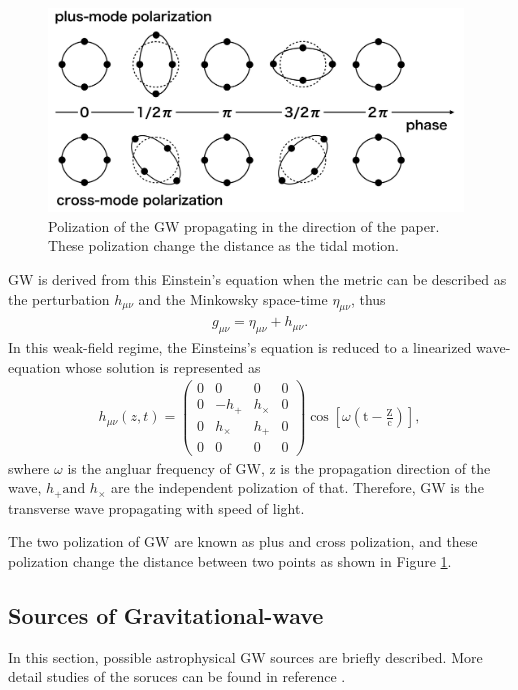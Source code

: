 \begin{figure}[t]
  \begin{center}   
    \includegraphics[width=11.0cm]{./img_chap1/img131.png}
    \caption[Polization of the GW]{Polization of the GW propagating in the direction of the paper. These polization change the distance as the tidal motion.
}\label{img:img131}
  \end{center}
\end{figure}

GW is derived from this Einstein's equation when the metric can be described as the perturbation $h_{\mu\nu}$ and the Minkowsky space-time $\eta_{\mu\nu}$, thus
\begin{eqnarray}
  g_{\mu \nu}=\eta_{\mu \nu}+h_{\mu \nu}.
\end{eqnarray}
In this weak-field regime, the Einsteins's equation is reduced to a linearized wave-equation whose solution is represented as
\begin{eqnarray}
  h_{\mu \nu}(z, t)=\left(\begin{array}{cccc}{0} & {0} & {0} & {0} \\ {0} & {-h_{+}} & {h_{\times}} & {0} \\ {0} & {h_{\times}} & {h_{+}} & {0} \\ {0} & {0} & {0} & {0}\end{array}\right) \cos \left[\omega\left(\mathrm{t}-\frac{\mathrm{Z}}{\mathrm{c}}\right)\right], \label{eq:eq130}
\end{eqnarray}
swhere $\omega$ is the angluar frequency of GW, $\mathrm{z}$ is the propagation direction of the wave, $h_{+} \text {and } h_{\times}$ are the independent polization of that. Therefore, GW is the transverse wave propagating with speed of light.

The two polization of GW are known as plus and cross polization, and these polization change the distance between two points as shown in Figure \ref{img:img131}. 

\subsection{Sources of Gravitational-wave}
In this section, possible astrophysical GW sources are briefly described. More detail studies of the soruces can be found in reference \cite{cutler2002overview}.

